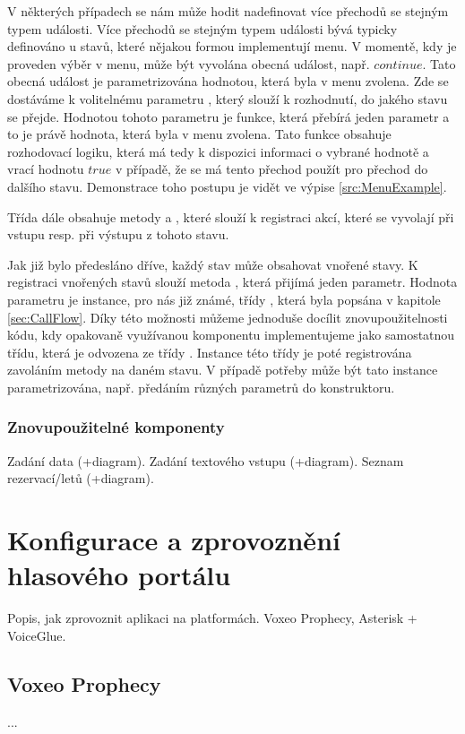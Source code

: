 \documentclass[ing,male,java,dept460]{diploma}						%
\begin{document}
V některých případech se nám může hodit nadefinovat více přechodů se stejným typem události. Více přechodů se stejným typem události bývá typicky definováno u stavů, které nějakou formou implementují menu. V momentě, kdy je proveden výběr v menu, může být vyvolána obecná událost, např. $continue$. Tato obecná událost je parametrizována hodnotou, která byla v menu zvolena. Zde se dostáváme k volitelnému parametru , který slouží k rozhodnutí, do jakého stavu se přejde. Hodnotou tohoto parametru je funkce, která přebírá jeden parametr a to je právě hodnota, která byla v menu zvolena. Tato funkce obsahuje rozhodovací logiku, která má tedy k dispozici informaci o vybrané hodnotě a vrací hodnotu $true$ v případě, že se má tento přechod použít pro přechod do dalšího stavu. Demonstrace toho postupu je vidět ve výpise \ref{src:MenuExample}.

Třída dále obsahuje metody  a , které slouží k registraci akcí, které se vyvolají při vstupu resp. při výstupu z tohoto stavu.

Jak již bylo předesláno dříve, každý stav může obsahovat vnořené stavy. K registraci vnořených stavů slouží metoda , která přijímá jeden parametr. Hodnota parametru  je instance, pro nás již známé, třídy , která byla popsána v kapitole \ref{sec:CallFlow}. Díky této možnosti můžeme jednoduše docílit znovupoužitelnosti kódu, kdy opakovaně využívanou komponentu implementujeme jako samostatnou třídu, která je odvozena ze třídy . Instance této třídy je poté registrována zavoláním metody  na daném stavu. V případě potřeby může být tato instance parametrizována, např. předáním různých parametrů do konstruktoru.

\subsubsection{Znovupoužitelné komponenty}
Zadání data (+diagram). Zadání textového vstupu (+diagram). Seznam rezervací/letů (+diagram).

\section{Konfigurace a zprovoznění hlasového portálu}
Popis, jak zprovoznit aplikaci na platformách. Voxeo Prophecy, Asterisk + VoiceGlue.

\subsection{Voxeo Prophecy}
...
\end{document}
